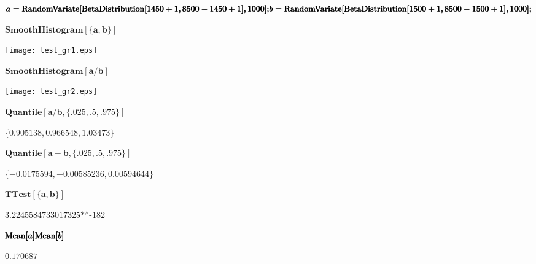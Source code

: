 \documentclass{article}
\begin{document}
\begin{doublespace}
\noindent\(\pmb{a = \text{RandomVariate}[\text{BetaDistribution}[1450+1, 8500-1450+1], 1000];}\\
\pmb{b = \text{RandomVariate}[\text{BetaDistribution}[1500+1, 8500-1500+1], 1000];}\)
\end{doublespace}

\begin{doublespace}
\noindent\(\pmb{\text{SmoothHistogram}[\{a,b\}]}\)
\end{doublespace}

\texttt{[image: test\_gr1.eps]}

\begin{doublespace}
\noindent\(\pmb{\text{SmoothHistogram}[a/b]}\)
\end{doublespace}

\texttt{[image: test\_gr2.eps]}

\begin{doublespace}
\noindent\(\pmb{\text{Quantile}[a/b, \{.025, .5, .975\}]}\)
\end{doublespace}

\begin{doublespace}
\noindent\(\{0.905138,0.966548,1.03473\}\)
\end{doublespace}

\begin{doublespace}
\noindent\(\pmb{\text{Quantile}[a-b, \{.025, .5, .975\}]}\)
\end{doublespace}

\begin{doublespace}
\noindent\(\{-0.0175594,-0.00585236,0.00594644\}\)
\end{doublespace}

\begin{doublespace}
\noindent\(\pmb{\text{TTest}[\{a, b\}]}\)
\end{doublespace}

\begin{doublespace}
\noindent\(\text{3.2245584733017325$\grave{ }$*${}^{\wedge}$-182}\)
\end{doublespace}

\begin{doublespace}
\noindent\(\pmb{\text{Mean}[a]}\\
\pmb{\text{Mean}[b]}\)
\end{doublespace}

\begin{doublespace}
\noindent\(0.170687\)
\end{doublespace}
\end{document}
